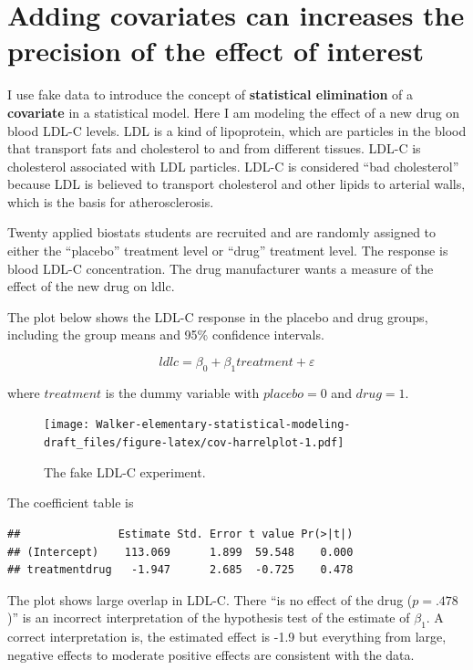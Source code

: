 \documentclass[]{book}
\begin{document}
\hypertarget{adding-covariates-can-increases-the-precision-of-the-effect-of-interest}{%
\section{Adding covariates can increases the precision of the effect of interest}\label{adding-covariates-can-increases-the-precision-of-the-effect-of-interest}}

I use fake data to introduce the concept of \textbf{statistical elimination} of a \textbf{covariate} in a statistical model. Here I am modeling the effect of a new drug on blood LDL-C levels. LDL is a kind of lipoprotein, which are particles in the blood that transport fats and cholesterol to and from different tissues. LDL-C is cholesterol associated with LDL particles. LDL-C is considered ``bad cholesterol'' because LDL is believed to transport cholesterol and other lipids to arterial walls, which is the basis for atherosclerosis.

Twenty applied biostats students are recruited and are randomly assigned to either the ``placebo'' treatment level or ``drug'' treatment level. The response is blood LDL-C concentration. The drug manufacturer wants a measure of the effect of the new drug on ldlc.

The plot below shows the LDL-C response in the placebo and drug groups, including the group means and 95\% confidence intervals.

\begin{equation}
ldlc = \beta_0 + \beta_1 treatment + \varepsilon
\label{eq:cov-no-cov}
\end{equation}

where \(treatment\) is the dummy variable with \(placebo=0\) and \(drug=1\).

\begin{figure}
\centering
\texttt{[image: Walker-elementary-statistical-modeling-draft\_files/figure-latex/cov-harrelplot-1.pdf]}
\caption{\label{fig:cov-harrelplot}The fake LDL-C experiment.}
\end{figure}

The coefficient table is

\begin{verbatim}
##               Estimate Std. Error t value Pr(>|t|)
## (Intercept)    113.069      1.899  59.548    0.000
## treatmentdrug   -1.947      2.685  -0.725    0.478
\end{verbatim}

The plot shows large overlap in LDL-C. There ``is no effect of the drug (\(p = .478\))'' is an incorrect interpretation of the hypothesis test of the estimate of \(\beta_1\). A correct interpretation is, the estimated effect is -1.9 but everything from large, negative effects to moderate positive effects are consistent with the data.
\end{document}
